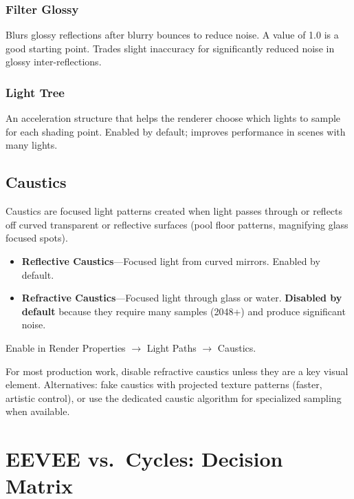 \subsubsection{Filter Glossy}

Blurs glossy reflections after blurry bounces to reduce noise. A
value of 1.0 is a good starting point. Trades slight inaccuracy for
significantly reduced noise in glossy inter-reflections.

\subsubsection{Light Tree}

An acceleration structure that helps the renderer choose which
lights to sample for each shading point. Enabled by default;
improves performance in scenes with many lights.

\subsection{Caustics}
\label{sec:shading:cycles:caustics}

Caustics are focused light patterns created when light passes
through or reflects off curved transparent or reflective surfaces
(pool floor patterns, magnifying glass focused spots).

\begin{itemize}[leftmargin=2em]
  \item \textbf{Reflective Caustics}---Focused light from curved
        mirrors. Enabled by default.
  \item \textbf{Refractive Caustics}---Focused light through glass
        or water. \textbf{Disabled by default} because they require
        many samples (2048+) and produce significant noise.
\end{itemize}

Enable in Render Properties $\rightarrow$ Light Paths $\rightarrow$
Caustics.

\begin{tipbox}
For most production work, disable refractive caustics unless they
are a key visual element. Alternatives: fake caustics with projected
texture patterns (faster, artistic control), or use the dedicated
caustic algorithm for specialized sampling when available.
\end{tipbox}


\section{EEVEE vs.\ Cycles: Decision Matrix}
\label{sec:shading:comparison}

